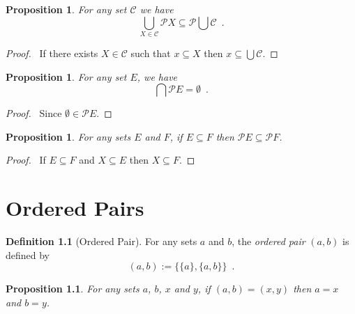 \documentclass{report}
\let\qed\relax
\newtheorem{prop}[ax]{Proposition}
\theoremstyle{definition}
\newtheorem{df}[ax]{Definition}
\begin{document}
\begin{prop}
For any set $\mathcal{C}$ we have
\[ \bigcup_{X \in \mathcal{C}} \mathcal{P} X \subseteq \mathcal{P} \bigcup \mathcal{C} \enspace . \]
\end{prop}

\begin{proof}
\pf\ If there exists $X \in \mathcal{C}$ such that $x \subseteq X$ then $x \subseteq \bigcup \mathcal{C}$. \qed
\end{proof}

\begin{prop}
For any set $E$, we have
\[ \bigcap \mathcal{P} E = \emptyset \enspace . \]
\end{prop}

\begin{proof}
\pf\ Since $\emptyset \in \mathcal{P} E$. \qed
\end{proof}

\begin{prop}
For any sets $E$ and $F$, if $E \subseteq F$ then $\mathcal{P} E \subseteq \mathcal{P} F$.
\end{prop}

\begin{proof}
\pf\ If $E \subseteq F$ and $X \subseteq E$ then $X \subseteq F$. \qed
\end{proof}

\chapter{Ordered Pairs}

\begin{df}[Ordered Pair]
For any sets $a$ and $b$, the \emph{ordered pair} $(a,b)$ is defined by
\[ (a,b) := \{ \{ a \}, \{ a, b \} \} \enspace . \]
\end{df}

\begin{prop}
For any sets $a$, $b$, $x$ and $y$, if $(a,b) = (x,y)$ then $a = x$ and $b = y$.
\end{prop}
\end{document}
